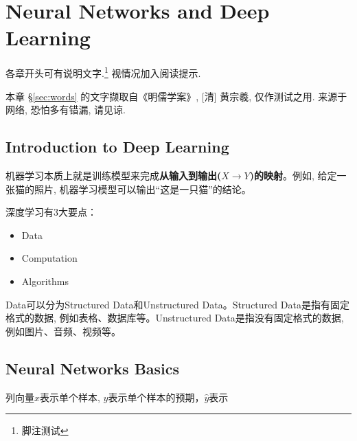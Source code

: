 \chapter{Neural Networks and Deep Learning}
	各章开头可有说明文字.\footnote{脚注测试} 视情况加入阅读提示.
	\begin{wenxintishi}
		本章 \S\ref{sec:words} 的文字撷取自《明儒学案》, [清] 黄宗羲, 仅作测试之用. 来源于网络, 恐怕多有错漏, 请见谅. 
	\end{wenxintishi}

	\section{Introduction to Deep Learning}
	机器学习本质上就是训练模型来完成\textbf{从输入到输出($X\to Y$)的映射}。例如, 给定一张猫的照片, 机器学习模型可以输出``这是一只猫''的结论。

	\vspace{0.5\baselineskip} %

	深度学习有3大要点：
	\begin{itemize}	
		\item Data
		\item Computation
		\item Algorithms
	\end{itemize}

	Data可以分为Structured Data和Unstructured Data。Structured Data是指有固定格式的数据, 例如表格、数据库等。Unstructured Data是指没有固定格式的数据, 例如图片、音频、视频等。

	\section{Neural Networks Basics}
	
	列向量$x$表示单个样本, $y$表示单个样本的预期，$\hat{y}$表示

